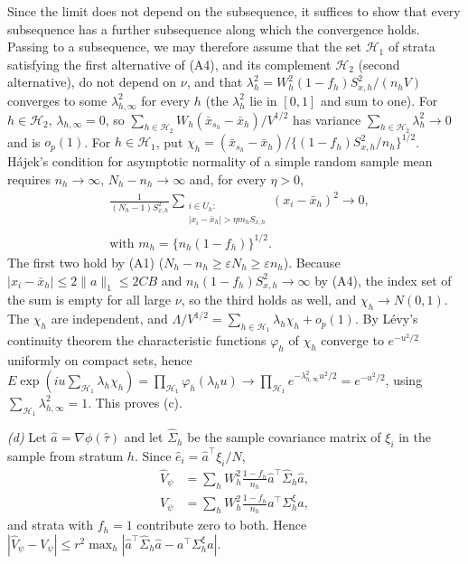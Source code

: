 \documentclass[pdflatex,sn-mathphys-num,iicol]{sn-jnl}
\theoremstyle{thmstyleone}
\theoremstyle{thmstyletwo}
\theoremstyle{thmstylethree}
\begin{document}
Since the limit does not depend on the subsequence, it suffices to show that every subsequence has
a further subsequence along which the convergence holds. Passing to a subsequence, we may therefore
assume that the set $\mathcal H_1$ of strata satisfying the first alternative of (A4), and its
complement $\mathcal H_2$ (second alternative), do not depend on $\nu$, and that
$\lambda_h^2=W_h^2(1-f_h)S^2_{x,h}/(n_hV)$ converges to some $\lambda_{h,\infty}^2$ for every $h$
(the $\lambda_h^2$ lie in $[0,1]$ and sum to one). For $h\in\mathcal H_2$,
$\lambda_{h,\infty}=0$, so $\sum_{h\in\mathcal H_2}W_h(\bar x_{s_h}-\bar x_h)/V^{1/2}$ has variance
$\sum_{h\in\mathcal H_2}\lambda_h^2\to0$ and is $o_p(1)$. For $h\in\mathcal H_1$, put
$\chi_h=(\bar x_{s_h}-\bar x_h)/\{(1-f_h)S^2_{x,h}/n_h\}^{1/2}$. Hájek's condition for asymptotic
normality of a simple random sample mean \citep{hajek1960} requires $n_h\to\infty$,
$N_h-n_h\to\infty$ and, for every $\eta>0$,
\begin{align*}
&\frac{1}{(N_h-1)S^2_{x,h}}\sum_{\substack{i\in U_h:\\ |x_i-\bar x_h|>\eta m_hS_{x,h}}}(x_i-\bar x_h)^2\to0,\\
&\text{with } m_h=\{n_h(1-f_h)\}^{1/2}.
\end{align*}
The first two hold by (A1) ($N_h-n_h\ge\varepsilon N_h\ge\varepsilon n_h$). Because
$|x_i-\bar x_h|\le2\|a\|_1\le2CB$ and $n_h(1-f_h)S^2_{x,h}\to\infty$ by (A4), the index set of the
sum is empty for all large $\nu$, so the third holds as well, and $\chi_h\to N(0,1)$. The $\chi_h$
are independent, and $\Lambda/V^{1/2}=\sum_{h\in\mathcal H_1}\lambda_h\chi_h+o_p(1)$. By Lévy's
continuity theorem the characteristic functions $\varphi_h$ of $\chi_h$ converge to
$e^{-u^2/2}$ uniformly on compact sets, hence
$E\exp(iu\sum_{\mathcal H_1}\lambda_h\chi_h)=\prod_{\mathcal H_1}\varphi_h(\lambda_hu)\to
\prod_{\mathcal H_1}e^{-\lambda_{h,\infty}^2u^2/2}=e^{-u^2/2}$, using
$\sum_{\mathcal H_1}\lambda_{h,\infty}^2=1$. This proves (c).

\emph{(d)} Let $\hat a=\nabla\phi(\hat\tau)$ and let $\hat\Sigma_h$ be the sample covariance matrix
of $\xi_i$ in the sample from stratum $h$. Since $\hat e_i=\hat a^\top\xi_i/N$,
\begin{align*}
\hat V_\psi&=\sum_hW_h^2\frac{1-f_h}{n_h}\hat a^\top\hat\Sigma_h\hat a,\\
V_\psi&=\sum_hW_h^2\frac{1-f_h}{n_h}a^\top\Sigma^\xi_ha,
\end{align*}
and strata with $f_h=1$ contribute zero to both. Hence
$|\hat V_\psi-V_\psi|\le r^2\max_h|\hat a^\top\hat\Sigma_h\hat a-a^\top\Sigma^\xi_ha|$.
\end{document}
